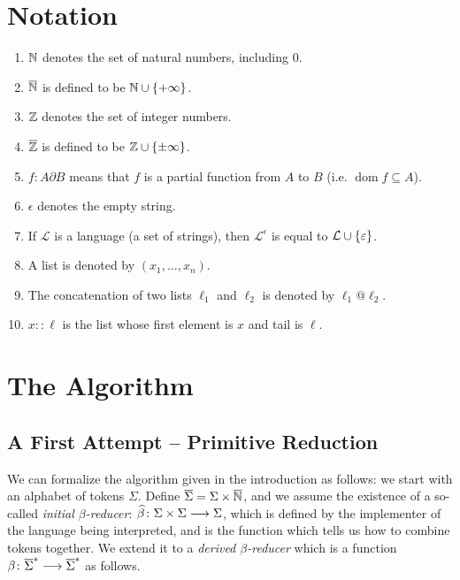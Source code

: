 \documentclass{llncs}
\newcounter{algo}
\begin{document}
\section{Notation}

\begin{enumerate}
    \item $\mathbb N$ denotes the set of natural numbers, including $0$.
    \item $\overline{\mathbb N}$ is defined to be $\bN\cup\set{+\infty}$.
    \item $\mathbb Z$ denotes the set of integer numbers.
    \item $\overline{\mathbb Z}$ is defined to be $\bZ\cup\set{\pm\infty}$.
    \item $f\colon A\partial B$ means that $f$ is a partial function from $A$ to $B$ (i.e. $\operatorname{dom}f\subseteq A$).
    \item $\epsilon$ denotes the empty string.
    \item If $\mathcal L$ is a language (a set of strings), then $\mathcal L^\epsilon$ is equal to $\mathcal L\cup\set\epsilon$.
    \item A list is denoted by $(x_1,\dots,x_n)$.
    \item The concatenation of two lists $\ell_1$ and $\ell_2$ is denoted by $\ell_1@\ell_2$.
    \item $x::\ell$ is the list whose first element is $x$ and tail is $\ell$.
\end{enumerate}

\section{The Algorithm}

\subsection{A First Attempt -- Primitive Reduction} \label{sec:firstattempt}

We can formalize the algorithm given in the introduction as follows: we start with an alphabet of tokens $\Sigma$.
Define $\overline\Sigma=\Sigma\times\overline{\mathbb N}$, and we assume the existence of a so-called \textit{initial $\beta$-reducer}:
$\widehat\beta\colon \Sigma\times\Sigma \longrightarrow \Sigma$, which is defined by the implementer of the language being interpreted, and is the function which
tells us how to combine tokens together.
We extend it to a \textit{derived $\beta$-reducer} which is a function $\beta\colon\overline\Sigma^*\longrightarrow\overline\Sigma^*$ as follows.
\end{document}
